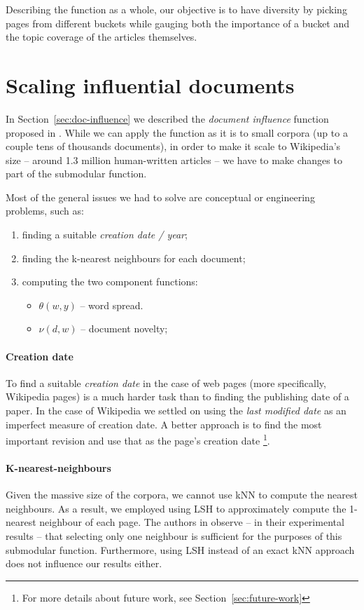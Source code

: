 Describing the function as a whole, our objective is to have diversity by
picking pages from different buckets while gauging both the importance of a
bucket and the topic coverage of the articles themselves.

\section{Scaling influential documents}
\label{sec:scale-doc-influence}

In Section~\vref{sec:doc-influence} we described the \emph{document influence}
function proposed in \cite{sipos2012temporal}.
While we can apply the function as it is to small corpora (up to a couple tens
of thousands documents), in order to make it scale to Wikipedia's size --
around 1.3 million human-written articles -- we have to make changes to part of
the submodular function.

Most of the general issues we had to solve are conceptual or engineering
problems, such as:
\begin{enumerate}
  \item finding a suitable \emph{creation date / year};
  \item finding the k-nearest neighbours for each document;
  \item computing the two component functions:
  \begin{itemize}
    \item \(\theta(w, y)\) -- word spread.
    \item \(\nu(d, w)\) -- document novelty;
  \end{itemize}
\end{enumerate}

\paragraph{Creation date}
To find a suitable \emph{creation date} in the case of web pages (more
specifically, Wikipedia pages) is a much harder task than to finding the
publishing date of a paper.
In the case of Wikipedia we settled on using the \emph{last modified date} as
an imperfect measure of creation date. A better approach is to find the most
important revision and use that as the page's creation date \footnote{For more
details about future work, see Section~\vref{sec:future-work}}.

\paragraph{K-nearest-neighbours}
Given the massive size of the corpora, we cannot use \ac{kNN} to compute the
nearest neighbours. As a result, we employed using \ac{LSH} to approximately
compute the 1-nearest neighbour of each page. The authors in
\cite{sipos2012temporal} observe -- in their experimental results -- that
selecting only one neighbour is sufficient for the purposes of this submodular
function. Furthermore, using \ac{LSH} instead of an exact \ac{kNN} approach
does not influence our results either.

